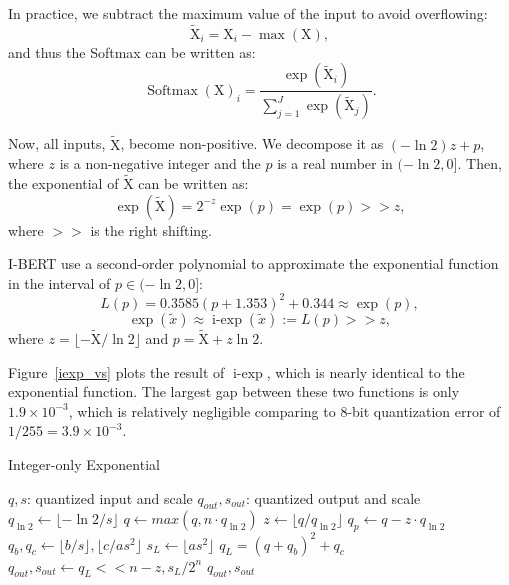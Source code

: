 \documentclass{article}
\begin{document}
In practice, we subtract the maximum value of the input to avoid overflowing:
\begin{equation}
    \tilde{\textrm{X}}_i = \textrm{X}_i-\operatorname{max}(\textrm{X}),
\end{equation}
and thus the Softmax can be written as:
\begin{equation}
    \operatorname{Softmax}(\textrm{X})_i = \frac{\exp(\tilde{\textrm{X}}_i)}{\sum_{j=1}^{J}\exp(\tilde{\textrm{X}}_j)}.
\end{equation}

Now, all inputs, $\tilde{\textrm{X}}$, become non-positive. We decompose it as $(-\ln 2)z+p$, where $z$ is a non-negative integer and the $p$ is a real number in $(-\ln 2, 0]$. Then, the exponential of $\tilde{\textrm{X}}$ can be written as:
\begin{equation}
    \exp(\tilde{\textrm{X}}) = 2^{-z}\exp(p) = \exp(p)>>z,
\end{equation}
where $>>$ is the right shifting.

I-BERT use a second-order polynomial to approximate the exponential function in the interval of $p\in (-\ln2, 0]$:
\begin{equation}
    L(p) = 0.3585(p+1.353)^2+0.344\approx\exp(p),
\end{equation}
\begin{equation}
    \exp(\tilde x)\approx \operatorname{i-exp}(\tilde x):= L(p)>>z,
\end{equation}
where $z = \lfloor -\tilde{\textrm{X}} / \ln2\rfloor$ and $p = \tilde{\textrm{X}} + z\ln2$. 


Figure~\ref{iexp_vs} plots the result of $\operatorname{i-exp}$, which is nearly identical to the exponential function. The largest gap between these two functions is only $1.9\times 10^{-3}$, which is relatively negligible comparing to 8-bit quantization error of $1/255 = 3.9 \times 10^{-3}$.


\begin{algorithm}[t]
\caption{Integer-only Exponential}
\label{iexp-alg}
\begin{algorithmic}[1]
 $q,s$: quantized input and scale
 $q_{out},s_{out}$: quantized output and scale
\vskip 0.075in
{
\STATE $q_{\ln2}\leftarrow\lfloor-\ln2/s\rfloor$
\STATE $q\leftarrow max(q, n\cdot q_{\ln2})$
\STATE $z\leftarrow\lfloor q/q_{\ln2}\rfloor$
\STATE $q_{p}\leftarrow q-z\cdot q_{\ln2}$
\STATE $q_b, q_c \leftarrow \lfloor b/s\rfloor, \lfloor c/as^2\rfloor$
\STATE $s_L\leftarrow \lfloor as^2\rfloor$
\STATE $q_L = (q+q_b)^2+q_c$
\STATE $q_{out}, s_{out}\leftarrow q_L<<n-z, s_L/2^n$
\STATE \Return $q_{out}, s_{out}$
}
\ENDFUNCTION
\end{algorithmic}
\end{algorithm}
\end{document}
